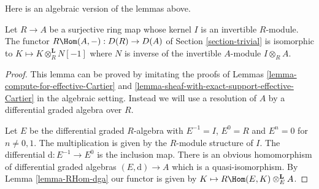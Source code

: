 \noindent
Here is an algebraic version of the lemmas above.

\begin{lemma}
\label{lemma-compute-for-effective-Cartier-algebraic}
Let $R \to A$ be a surjective ring map whose kernel $I$
is an invertible $R$-module. The functor
$R\Hom(A, -) : D(R) \to D(A)$ of Section \ref{section-trivial}
is isomorphic to $K \mapsto K \otimes_R^\mathbf{L} N[-1]$
where $N$ is inverse of the invertible $A$-module $I \otimes_R A$.
\end{lemma}

\begin{proof}
This lemma can be proved by imitating the proofs of
Lemmas \ref{lemma-compute-for-effective-Cartier} and
\ref{lemma-sheaf-with-exact-support-effective-Cartier}
in the algebraic setting.
Instead we will use a resolution of $A$ by a differential
graded algebra over $R$.

\medskip\noindent
Let $E$ be the differential graded $R$-algebra with
$E^{-1} = I$, $E^0 = R$ and $E^n = 0$ for $n \not = 0, 1$.
The multiplication is given by the $R$-module structure of $I$.
The differential $\text{d} : E^{-1} \to E^0$ is the inclusion map.
There is an obvious homomorphism of differential graded algebras
$(E, \text{d}) \to A$ which is a quasi-isomorphism. By
Lemma \ref{lemma-RHom-dga}
our functor is given by $K \mapsto R\Hom(E, K) \otimes_E^\mathbf{L} A$.


\end{proof}
